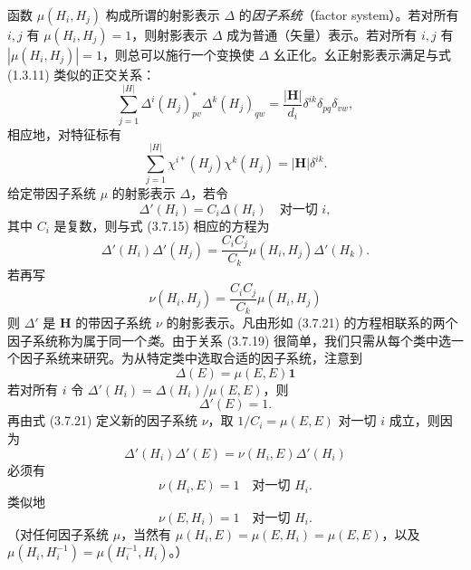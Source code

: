 函数 $\mu(H_{i}, H_{j})$ 构成所谓的射影表示 $\Delta$ 的\textit{因子系统}（factor system）。若对所有 $i, j$ 有 $\mu(H_{i}, H_{j}) = 1$，则射影表示 $\Delta$ 成为普通（矢量）表示。若对所有 $i, j$ 有 $|\mu(H_{i}, H_{j})| = 1$，则总可以施行一个变换使 $\Delta$ 幺正化。幺正射影表示满足与式 (1.3.11) 类似的正交关系：
\begin{equation*}
\sum^{|H|}_{j=1}\Delta^{i}(H_{j})^{*}_{pv}\Delta^{k}(H_{j})_{qw} = \frac{|\mathbf{H}|}{d_{i}}\delta^{ik}\delta_{pq}\delta_{vw},
\tag{3.7.17}
\end{equation*}
相应地，对特征标有
\begin{equation*}
\sum^{|H|}_{j=1}\chi^{i*}(H_{j})\chi^{k}(H_{j}) = |\mathbf{H}|\delta^{ik}.
\tag{3.7.18}
\end{equation*}
给定带因子系统 $\mu$ 的射影表示 $\Delta$，若令
\begin{equation*}
\Delta'(H_{i}) = C_{i}\Delta(H_{i}) \quad\text{对一切 } i,
\tag{3.7.19}
\end{equation*}
其中 $C_{i}$ 是复数，则与式 (3.7.15) 相应的方程为
\begin{equation*}
\Delta'(H_{i})\Delta'(H_{j}) = \frac{C_{i}C_{j}}{C_{k}}\mu(H_{i}, H_{j})\Delta'(H_{k}).
\tag{3.7.20}
\end{equation*}
若再写
\begin{equation*}
\nu(H_{i}, H_{j}) = \frac{C_{i}C_{j}}{C_{k}}\mu(H_{i}, H_{j})
\tag{3.7.21}
\end{equation*}
则 $\Delta'$ 是 $\mathbf{H}$ 的带因子系统 $\nu$ 的射影表示。凡由形如 (3.7.21) 的方程相联系的两个因子系统称为属于同一个\textit{类}。由于关系 (3.7.19) 很简单，我们只需从每个类中选一个因子系统来研究。为从特定类中选取合适的因子系统，注意到
\begin{equation*}
\Delta(E) = \mu(E, E)\mathbf{1}
\tag{3.7.22}
\end{equation*}
若对所有 $i$ 令 $\Delta'(H_{i}) = \Delta(H_{i})/\mu(E, E)$，则
\begin{equation*}
\Delta'(E) = 1.
\tag{3.7.23}
\end{equation*}
再由式 (3.7.21) 定义新的因子系统 $\nu$，取 $1/C_{i} = \mu(E, E)$ 对一切 $i$ 成立，则因为
\begin{equation*}
\Delta'(H_{i})\Delta'(E) = \nu(H_{i}, E)\Delta'(H_{i})
\end{equation*}
必须有
\begin{equation*}
\nu(H_{i}, E) = 1 \quad\text{对一切 } H_{i}.
\tag{3.7.24}
\end{equation*}
类似地
\begin{equation*}
\nu(E, H_{i}) = 1 \quad\text{对一切 } H_{i}.
\tag{3.7.25}
\end{equation*}
（对任何因子系统 $\mu$，当然有 $\mu(H_{i}, E) = \mu(E, H_{i}) = \mu(E, E)$，以及 $\mu(H_{i}, H^{-1}_{i}) = \mu(H^{-1}_{i}, H_{i})$。）

